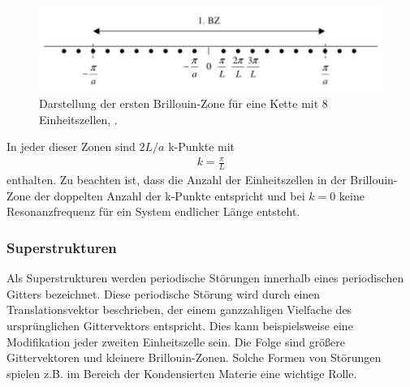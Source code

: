 \begin{figure}[H]
  \centering
  \includegraphics{ressources/Brillouin.pdf}
  \caption{Darstellung der ersten Brillouin-Zone für eine Kette mit 8 Einheitszellen, \cite{skript}.}
  \label{fig:Brill}
\end{figure}

In jeder dieser Zonen sind $2L/a$ k-Punkte mit
\begin{align}
  k=\frac{\pi}{L}
  \label{eq:k}
\end{align}
enthalten. Zu beachten ist, dass die Anzahl der Einheitszellen in der Brillouin-Zone der doppelten Anzahl der k-Punkte entspricht und bei $k=0$ keine Resonanzfrequenz für ein System endlicher Länge entsteht.

\subsubsection{Superstrukturen}
Als Superstrukturen werden periodische Störungen innerhalb eines periodischen Gitters bezeichnet. Diese periodische Störung wird durch einen Translationsvektor beschrieben, der einem ganzzahligen Vielfache des ursprünglichen Gittervektors entspricht. Dies kann beispielsweise eine Modifikation jeder zweiten Einheitszelle sein. Die Folge sind größere Gittervektoren und kleinere Brillouin-Zonen. Solche Formen von Störungen spielen z.B. im Bereich der Kondensierten Materie eine wichtige Rolle.

